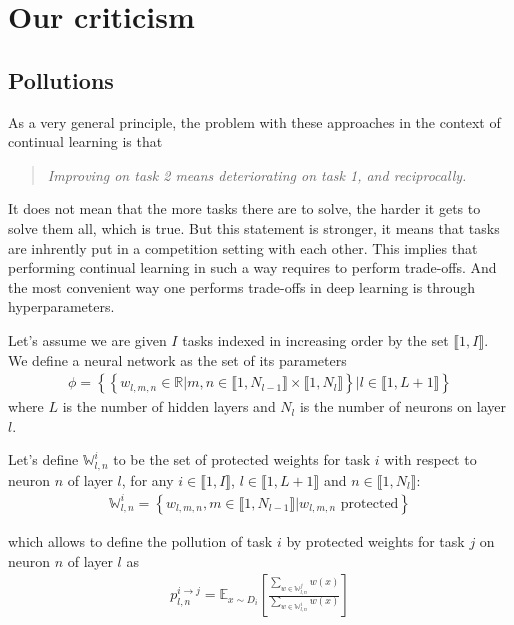\documentclass[11pt]{article}
\newcommand{\intset}[2]{\llbracket #1, #2 \rrbracket}
\begin{document}
\section{Our criticism}



\subsection{Pollutions}


\noindent
As a very general principle, the problem with these approaches in the context of continual learning is that
\begin{quote}
    \itshape
    \centering
    Improving on task 2 means deteriorating on task 1, and reciprocally.
\end{quote}

\noindent
It does not mean that the more tasks there are to solve, the harder it gets to solve them all, which is true. But this statement is stronger, it means that tasks are inhrently put in a competition setting with each other. This implies that performing continual learning in such a way requires to perform trade-offs. And the most convenient way one performs trade-offs in deep learning is through hyperparameters.

\vspace{1mm}
\noindent
Let's assume we are given $I$ tasks indexed in increasing order by the set $\intset{1}{I}$. We define a neural network as the set of its parameters
\begin{align}
    \phi = \left\{\left\{ w_{l,m,n} \in \mathbb{R} | m,n \in \llbracket 1, N_{l-1} \rrbracket \times \llbracket 1, N_{l} \rrbracket \right\} | l \in \llbracket 1, L+1 \rrbracket \right\}
\end{align}
where $L$ is the number of hidden layers and $N_l$ is the number of neurons on layer $l$.

\vspace{1mm}
\noindent
Let's define $\mathbb{W}_{l,n}^i$ to be the set of protected weights for task $i$ with respect to neuron $n$ of layer $l$, for any $i \in \intset{1}{I}$, $l \in \intset{1}{L+1}$ and $n \in \intset{1}{N_l}$:
\begin{align}
    \mathbb{W}_{l,n}^i = \left\{ w_{l,m,n}, m \in \intset{1}{N_{l-1}} | w_{l,m,n} \text{ protected} \right\}
\end{align}

\vspace{1mm}
\noindent
which allows to define the pollution of task $i$ by protected weights for task $j$ on neuron $n$ of layer $l$ as
\begin{align}
    p_{l,n}^{i\rightarrow j} = \mathbb{E}_{x \sim D_i}\left[\frac{\sum_{w \in \mathbb{W}_{l,n}^j}{w(x)}}{\sum_{w \in \mathbb{W}_{l,n}^i}{w(x)}}\right]
\end{align}
\end{document}
